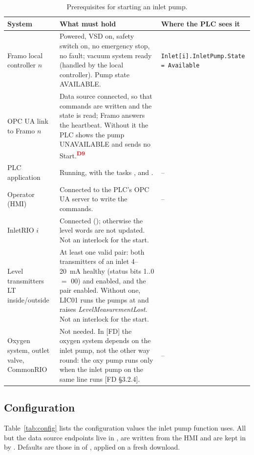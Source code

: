 \documentclass[11pt]{article}
\newcommand{\code}[1]{\texttt{#1}}
\newcommand{\dev}[1]{\textsuperscript{\textcolor{red}{\textbf{D#1}}}}
\begin{document}
\begin{table}[htbp]
\centering\small
\caption{Prerequisites for starting an inlet pump.}
\label{tab:prereq}
\begin{tabularx}{\textwidth}{@{}P{38mm}LP{40mm}@{}}
\toprule
System & What must hold & Where the PLC sees it \\
\midrule
Framo local controller $n$ & Powered, VSD on, safety switch on, no emergency stop, no fault;
  vacuum system ready (handled by the local controller). Pump state AVAILABLE. &
  \code{Inlet[i].InletPump.State = Available} \\
OPC UA link to Framo $n$ & Data source  connected, so that commands are written and
  the state is read; Framo answers the heartbeat. Without it the PLC shows the pump UNAVAILABLE and
  sends no Start.\dev{9} &
   \\
PLC application & Running, with the tasks ,  and
  . & -- \\
Operator (HMI) & Connected to the PLC's OPC UA server to write the commands. & -- \\
\midrule
InletRIO $i$ & Connected (); otherwise the level words are not
  updated. Not an interlock for the start. &  \\
Level transmitters LT inside/outside & At least one valid pair: both transmitters of an inlet
  4--20~mA healthy (status bits 1..0 $=$ 00) and enabled, and the pair enabled. Without one, LIC01
  runs the pumps at  and raises \emph{LevelMeasurementLost}. Not an interlock for
  the start. &  \\
\midrule
Oxygen system, outlet valve, CommonRIO & Not needed. In [FD] the oxygen system depends on the
  inlet pump, not the other way round: the oxy pump runs only when the inlet pump on the same
  line runs [FD \S3.2.4]. & -- \\
\bottomrule
\end{tabularx}
\end{table}

\subsection{Configuration}
\label{sec:config}

Table~\ref{tab:config} lists the configuration values the inlet pump function uses. All but the
data source endpoints live in , are written from the HMI and are kept in
 by . Defaults are those in  of
, applied on a fresh download.
\end{document}
